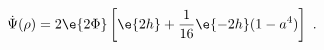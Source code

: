 \begin{equation}
\label{dotPsi}
  \dot{\Psi}(\rho) =  2 \e{2\Phi}
    \left[\e{2h} +\frac1{16} \e{-2h} (1-a^4) \right]~.
\end{equation}

